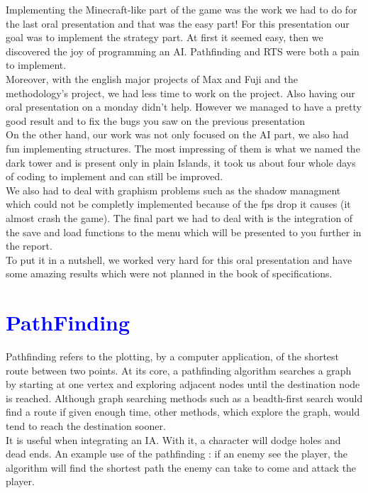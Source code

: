 \documentclass[article]{report}             %
\begin{document}
			Implementing the Minecraft-like part of the game was the work we had to do for the last oral presentation and that was the easy part! For this presentation our goal was to implement the strategy part. At first it seemed easy, then we discovered the joy of programming an AI. Pathfinding and RTS were both a pain to implement. \\

 			Moreover, with the english major projects of Max and Fuji and the methodology's project, we had less time to work on the project. Also having our oral presentation on a monday didn't help. However we managed to have a pretty good result and to fix the bugs you saw on the previous presentation\\

 			On the other hand, our work was not only focused on the AI part, we also had fun implementing structures. The most impressing of them is what we named the dark tower and is present only in plain Islands, it took us about four whole days of coding to implement and can still be improved.\\
			
			We also had to deal with graphism problems such as the shadow managment which could not be completly implemented because of the fps drop it causes (it almost crash the game). The final part we had to deal with is the integration of the save and load functions to the menu which will be presented to you further in the report.\\
			
			To put it in a nutshell, we worked very hard for this oral presentation and have some amazing results which were not planned in the book of specifications. 
  		\chapter{\textcolor{blue}{PathFinding}}
Pathfinding refers to the plotting, by a computer application, of the shortest route between two points. At its core, a pathfinding algorithm searches a graph by starting at one vertex and exploring adjacent nodes until the destination node is reached. Although graph searching methods such as a beadth-first search would find a route if given enough time, other methods, which explore the graph, would tend to reach the destination sooner. \\
It is useful when integrating an IA. With it, a character will dodge holes and dead ends. An example use of the pathfinding : if an enemy see the player, the algorithm will find the shortest path the enemy can take to come and attack the player.
\end{document}
